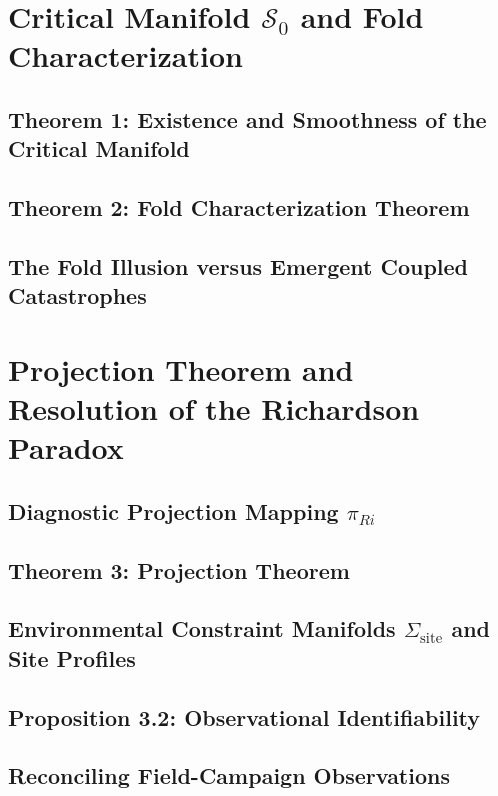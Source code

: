 \documentclass[11pt,letterpaper]{article}
\begin{document}
\section{Critical Manifold $\mathcal{S}_0$ and Fold Characterization}
\label{sec:critical-manifold}

\subsection{Theorem 1: Existence and Smoothness of the Critical Manifold}

\subsection{Theorem 2: Fold Characterization Theorem}

\subsection{The Fold Illusion versus Emergent Coupled Catastrophes}

\section{Projection Theorem and Resolution of the Richardson Paradox}
\label{sec:projection}

\subsection{Diagnostic Projection Mapping $\pi_{Ri}$}

\subsection{Theorem 3: Projection Theorem}

\subsection{Environmental Constraint Manifolds $\Sigma_{\text{site}}$ and Site Profiles}

\subsection{Proposition 3.2: Observational Identifiability}

\subsection{Reconciling Field-Campaign Observations}
\end{document}
